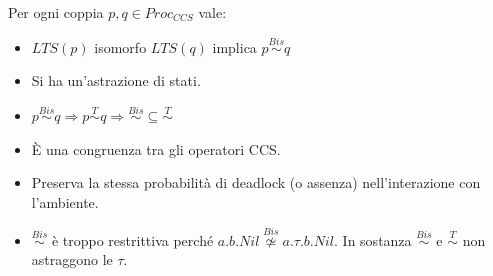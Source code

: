 \begin{osservazione}
    Per ogni coppia $p, q \in Proc_{CCS}$ vale:
    \begin{itemize}
        \item $LTS(p)$ isomorfo $LTS(q)$ implica $p \stackrel{Bis}{\sim} q$
        \item Si ha un'astrazione di stati.
        \item $p \stackrel{Bis}{\sim} q \Rightarrow p \stackrel{T}{\sim} q \Rightarrow
                  \stackrel{Bis}{\sim} \subseteq \stackrel{T}{\sim}$
        \item È una congruenza tra gli operatori CCS.
        \item Preserva la stessa probabilità di deadlock (o assenza) nell'interazione
              con l'ambiente.
        \item $\stackrel{Bis}{\sim}$ è troppo restrittiva perché $a.b.Nil
                  \stackrel{Bis}{\not\simeq} a.\tau.b.Nil$. In sostanza $\stackrel{Bis}{\sim}$ e
              $\stackrel{T}{\sim}$ non astraggono le $\tau$.
    \end{itemize}
\end{osservazione}

